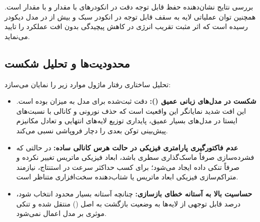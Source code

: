 بررسی نتایج نشان‌دهنده حفظ قابل توجه دقت در انکودرهای  با مقدار  و  با مقدار  است. همچنین توان عملیاتی لایه به سقف قابل توجه  در انکودر سبک و بیش از  در مدل دیکودر  رسیده است که اثر مثبت تقریب انرژی در کاهش پیچیدگی بدون افت عملکرد را تایید می‌نماید.

\subsection{محدودیت‌ها و تحلیل شکست}
تحلیل ساختاری رفتار ماژول موارد زیر را نمایان می‌سازد:
\begin{itemize}
    \item \textbf{شکست در مدل‌های زبانی عمیق ():} دقت ثبت‌شده برای مدل  به میزان  بوده است. این افت شدید نمایانگر این واقعیت است که حذف نورونی و کانالی با نسبت‌های ایستا در مدل‌های بسیار عمیق، پایداری توزیع لایه‌های انتهایی و تعادل مکانیزم پیش‌بینی توکن بعدی را دچار فروپاشی نسبی می‌کند.
    \item \textbf{عدم فاکتورگیری پارامتری فیزیکی در حالت هرس کانالی ساده:} در حالتی که فشرده‌سازی صرفاً ماسک‌گذاری سطری باشد، ابعاد فیزیکی ماتریس تغییر نکرده و صرفاً تنکی داده ایجاد می‌شود؛ برای کسب حداکثر سرعت در استنتاج، نیازمند متراکم‌سازی فیزیکی ابعاد ماتریس یا شتاب‌دهنده سخت‌افزاری متناظر است.
    \item \textbf{حساسیت بالا به آستانه خطای بازسازی:} چنانچه آستانه  بسیار محدود انتخاب شود، درصد قابل توجهی از لایه‌ها به وضعیت بازگشت به اصل () منتقل شده و تنکی موثری بر مدل اعمال نمی‌شود.
\end{itemize}
